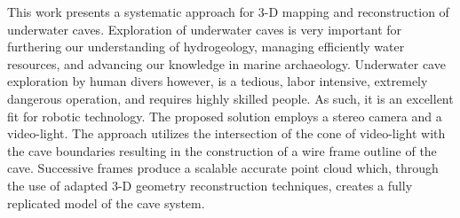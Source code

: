 This work presents a systematic approach for 3-D mapping and reconstruction of underwater caves. Exploration of underwater caves is very important for furthering our understanding of hydrogeology, managing efficiently water resources, and advancing our knowledge in marine archaeology. Underwater cave exploration by human divers however, is a tedious, labor intensive, extremely dangerous operation, and requires highly skilled people. As such, it is an excellent fit for robotic technology. The proposed solution employs a stereo camera and a video-light. The approach utilizes the intersection of the cone of video-light with the cave boundaries resulting in the construction of a wire frame outline of the cave. Successive frames produce a scalable accurate point cloud which, through the use of adapted 3-D geometry reconstruction techniques, creates a fully replicated model of the cave system.